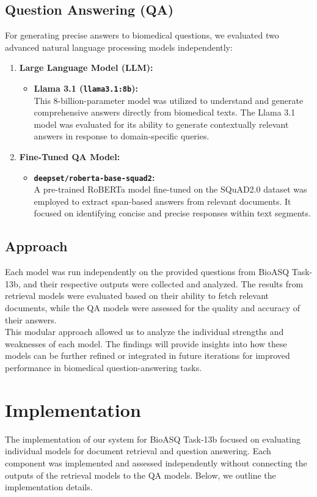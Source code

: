 \documentclass{article}
\begin{document}
\subsection{Question Answering (QA)}
For generating precise answers to biomedical questions, we evaluated two advanced natural language processing models independently:

\begin{enumerate}
    \item \textbf{Large Language Model (LLM):}
    \begin{itemize}
        \item \textbf{Llama 3.1 (\texttt{llama3.1:8b}):}\\
        This 8-billion-parameter model was utilized to understand and generate comprehensive answers directly from biomedical texts. The Llama 3.1 model was evaluated for its ability to generate contextually relevant answers in response to domain-specific queries.
    \end{itemize}
    \item \textbf{Fine-Tuned QA Model:}
    \begin{itemize}
        \item \textbf{\texttt{deepset/roberta-base-squad2}:}\\
        A pre-trained RoBERTa model fine-tuned on the SQuAD2.0 dataset was employed to extract span-based answers from relevant documents. It focused on identifying concise and precise responses within text segments.
    \end{itemize}
\end{enumerate}

\subsection{Approach}
Each model was run independently on the provided questions from BioASQ Task-13b, and their respective outputs were collected and analyzed. The results from retrieval models were evaluated based on their ability to fetch relevant documents, while the QA models were assessed for the quality and accuracy of their answers.\\

This modular approach allowed us to analyze the individual strengths and weaknesses of each model. The findings will provide insights into how these models can be further refined or integrated in future iterations for improved performance in biomedical question-answering tasks.

\section{Implementation}
The implementation of our system for BioASQ Task-13b focused on evaluating individual models for document retrieval and question answering. Each component was implemented and assessed independently without connecting the outputs of the retrieval models to the QA models. Below, we outline the implementation details.
\end{document}

